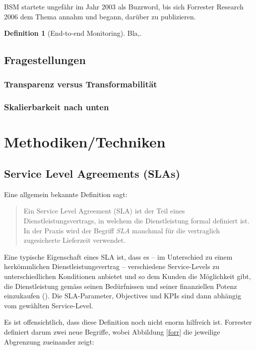 \documentclass[11pt,listof=totoc]{scrreprt} %
\theoremstyle{definition}
\newtheorem{definition}{Definition}
\begin{document}
BSM startete ungefähr im Jahr 2003 als Buzzword, bis sich Forrester Research 2006 dem Thema annahm und begann, darüber zu publizieren. \cite{wiki:bsm, forrester:bsm, forrester:implementingBsm}

\begin{definition}[End-to-end Monitoring]
Bla,.
\end{definition}

\section{Fragestellungen}

\subsection{Transparenz versus Transformabilität}

\subsection{Skalierbarkeit nach unten}

\chapter{Methodiken/Techniken}
\label{methodiken}

\section{Service Level Agreements (SLAs)}
Eine allgemein bekannte Definition sagt:
\begin{quote}
Ein Service Level Agreement (SLA) ist der Teil eines Dienstleistungsvertrags, in welchem die Dienstleistung formal definiert ist. In der Praxis wird der Begriff {\em SLA} manchmal für die vertraglich zugesicherte Lieferzeit verwendet. \cite{wiki:sla}
\end{quote}

Eine typische Eigenschaft eines SLA ist, dass es -- im Unterschied zu einem herkömmlichen Dienstleistungsvertrag -- verschiedene Service-Levels zu unterschiedlichen Konditionen anbietet und so dem Kunden die Möglichkeit gibt, die Dienstleistung gemäss seinen Bedürfnissen und seiner finanziellen Potenz einzukaufen (\cite{EllisKauferstein200311}). Die SLA-Parameter, Objectives und KPIs sind dann abhängig vom gewählten Service-Level.

Es ist offensichtlich, dass diese Definition noch nicht enorm hilfreich ist. Forrester definiert darum zwei neue Begriffe, wobei Abbildung \ref{forr} die jeweilige Abgrenzung zueinander zeigt:
\end{document}
